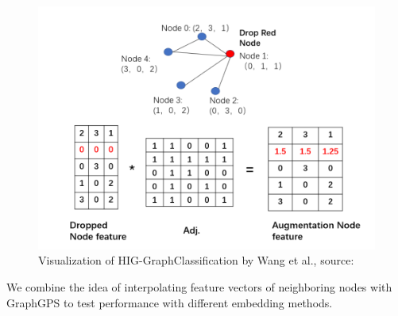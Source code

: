 \begin{figure}[h!]
    \centering
    \includegraphics[scale=0.3]{tex/res/hig_figure.png}
    \caption{Visualization of HIG-GraphClassification by Wang et al., \tiny{source: \cite{tencenc2021HigPaper}}}
    \label{fig:hig_figure}
\end{figure}

We combine the idea of interpolating feature vectors of neighboring nodes with GraphGPS to test performance with different embedding methods.